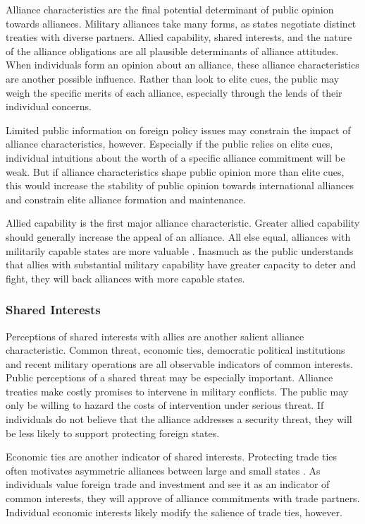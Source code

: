 \documentclass[12pt]{article}
\begin{document}
Alliance characteristics are the final potential determinant of public opinion towards alliances.
Military alliances take many forms, as states negotiate distinct treaties with diverse partners.
Allied capability, shared interests, and the nature of the alliance obligations are all plausible determinants of alliance attitudes.   
When individuals form an opinion about an alliance, these alliance characteristics are another possible influence. 
Rather than look to elite cues, the public may weigh the specific merits of each alliance, especially through the lends of their individual concerns. 


Limited public information on foreign policy issues may constrain the impact of alliance characteristics, however. 
Especially if the public relies on elite cues, individual intuitions about the worth of a specific alliance commitment will be weak. 
But if alliance characteristics shape public opinion more than elite cues, this would increase the stability of public opinion towards international alliances and constrain elite alliance formation and maintenance. 


Allied capability is the first major alliance characteristic.
Greater allied capability should generally increase the appeal of an alliance. 
All else equal, alliances with militarily capable states are more valuable \citep{Johnsonetal2015}. 
Inasmuch as the public understands that allies with substantial military capability have greater capacity to deter and fight, they will back alliances with more capable states. 


\subsubsection*{Shared Interests}

Perceptions of shared interests with allies are another salient alliance characteristic. 
Common threat, economic ties, democratic political institutions and recent military operations are all observable indicators of common interests. 
Public perceptions of a shared threat may be especially important. 
Alliance treaties make costly promises to intervene in military conflicts. 
The public may only be willing to hazard the costs of intervention under serious threat. 
If individuals do not believe that the alliance addresses a security threat, they will be less likely to support protecting foreign states. 


Economic ties are another indicator of shared interests. 
Protecting trade ties often motivates asymmetric alliances between large and small states \citep{Fordham2010}. 
As individuals value foreign trade and investment and see it as an indicator of common interests, they will approve of alliance commitments with trade partners.
Individual economic interests likely modify the salience of trade ties, however.
\end{document}

